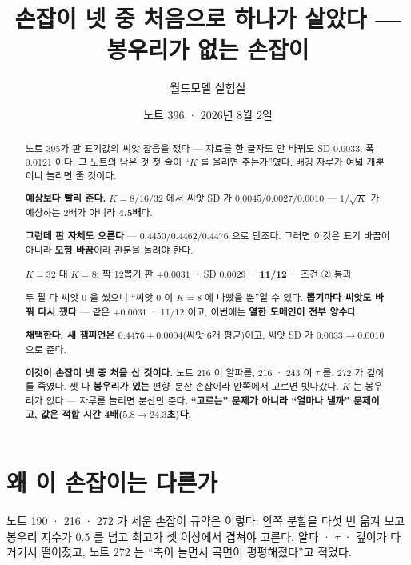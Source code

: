 \documentclass[11pt]{article}
\begin{document}
\title{손잡이 넷 중 처음으로 하나가 살았다 --- 봉우리가 없는 손잡이}
\author{월드모델 실험실}
\date{노트 396 · 2026년 8월 2일}
\maketitle

\begin{abstract}
노트 395가 판 표기값의 씨앗 잡음을 쟀다 --- 자료를 한 글자도 안 바꿔도
SD 0.0033, 폭 0.0121 이다. 그 노트의 남은 것 첫 줄이 ``$K$ 를 올리면
주는가''였다. 배깅 자루가 여덟 개뿐이니 늘리면 줄 것이다.

\textbf{예상보다 빨리 준다.} $K = 8 / 16 / 32$ 에서 씨앗 SD 가
$0.0045 / 0.0027 / \mathbf{0.0010}$ --- $1/\sqrt{K}$ 가 예상하는 2배가
아니라 \textbf{4.5배}다.

\textbf{그런데 판 자체도 오른다} --- $0.4450 / 0.4462 / \mathbf{0.4476}$
으로 단조다. 그러면 이것은 표기 바꿈이 아니라 \textbf{모형 바꿈}이라
관문을 돌려야 한다.

\begin{center}
$K{=}32$ 대 $K{=}8$: 짝 12뽑기 판 $\mathbf{+0.0031}$ · SD 0.0029 ·
\textbf{11/12} · 조건 ② 통과
\end{center}

두 팔 다 씨앗 0 을 썼으니 ``씨앗 0 이 $K{=}8$ 에 나빴을 뿐''일 수 있다.
\textbf{뽑기마다 씨앗도 바꿔 다시 쟀다} --- 같은 $+0.0031$ · 11/12 이고,
이번에는 \textbf{열한 도메인이 전부 양수}다.

\textbf{채택한다. 새 챔피언은 $\mathbf{0.4476 \pm 0.0004}$}(씨앗 6개
평균)이고, 씨앗 SD 가 $0.0033 \to 0.0010$ 으로 준다.

\textbf{이것이 손잡이 넷 중 처음 산 것이다.} 노트 216 이 알파를,
216 · 243 이 $\tau$ 를, 272 가 깊이를 죽였다. 셋 다 \textbf{봉우리가 있는}
편향--분산 손잡이라 안쪽에서 고르면 빗나갔다. $K$ 는 봉우리가 없다 ---
자루를 늘리면 분산만 준다. \textbf{``고르는'' 문제가 아니라 ``얼마나
낼까'' 문제이고, 값은 적합 시간 4배($5.8 \to 24.3$초)다.}
\end{abstract}

\section{왜 이 손잡이는 다른가}

노트 190 · 216 · 272 가 세운 손잡이 규약은 이렇다: 안쪽 분할을 다섯 번
옮겨 보고 봉우리 지수가 0.5 를 넘고 최고가 셋 이상에서 겹쳐야 고른다.
알파 · $\tau$ · 깊이가 다 거기서 떨어졌고, 노트 272 는 ``축이 늘면서
곡면이 평평해졌다''고 적었다.
\end{document}
